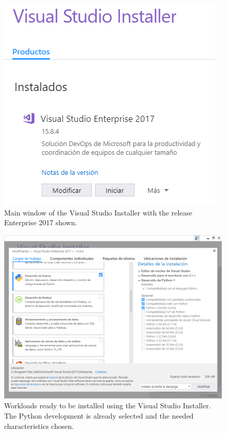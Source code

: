 \begin{figure}
	\centering
	\includegraphics[scale=0.65]{./Figures/PT0.png}
	\caption{Main window of the Visual Studio Installer with the release Enterprise 2017 shown.}
	\label{fig:vsi:list}
\end{figure}

\begin{figure}
	\centering
	\includegraphics[scale=0.5]{./Figures/PT1V2.png}
	\caption{Workloads ready to be installed using the Visual Studio Installer. The Python development is already selected and the needed characteristics chosen.}
	\label{fig:vsi:mods}
\end{figure}


